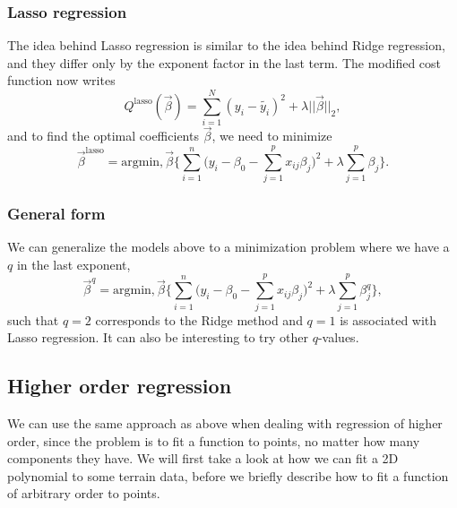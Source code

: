 \subsubsection{Lasso regression} \label{sec:lasso}
The idea behind Lasso regression is similar to the idea behind Ridge regression, and they differ only by the exponent factor in the last term. The modified cost function now writes
\begin{equation}
Q^{\text{lasso}}(\vec{\beta})=\sum_{i=1}^N(y_i-\tilde{y_i})^2+\lambda||\vec{\beta}||_2,
\end{equation}
and to find the optimal coefficients $\vec{\beta}$, we need to minimize
\begin{equation}
\vec{\beta}^{\text{lasso}}=\text{argmin},\vec{\beta}\bigg\{\sum_{i=1}^{n}\Big(y_i-\beta_0-\sum_{j=1}^px_{ij}\beta_j\Big)^2+\lambda\sum_{j=1}^p\beta_j\bigg\}.
\end{equation}

\subsubsection{General form} \label{sec:general}
We can generalize the models above to a minimization problem where we have a $q$ in the last exponent, 
\begin{equation}
\vec{\beta}^q=\text{argmin},\vec{\beta}\bigg\{\sum_{i=1}^{n}\Big(y_i-\beta_0-\sum_{j=1}^px_{ij}\beta_j\Big)^2+\lambda\sum_{j=1}^p\beta_j^q\bigg\},
\end{equation}
such that $q=2$ corresponds to the Ridge method and $q=1$ is associated with Lasso regression. It can also be interesting to try other $q$-values.

\subsection{Higher order regression} \label{sec:higher_reg}
We can use the same approach as above when dealing with regression of higher order, since the problem is to fit a function to points, no matter how many components they have. We will first take a look at how we can fit a 2D polynomial to some terrain data, before we briefly describe how to fit a function of arbitrary order to points.

